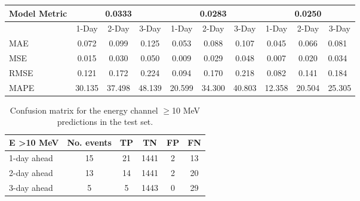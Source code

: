 \begin{table}[!htp]
\begin{tabular}{lccccccccl}
Model Metric & \multicolumn{3}{c}{0.0333}                      & \multicolumn{3}{c}{0.0283}                      & \multicolumn{3}{c}{0.0250}                      \\ \hline
       & 1-Day          & 2-Day          & 3-Day         & 1-Day          & 2-Day          & 3-Day         & 1-Day    & 2-Day   & \multicolumn{1}{c}{3-Day}  \\ \hline
MAE    & 0.072          & 0.099          & 0.125         & 0.053          & 0.088          & 0.107         & 0.045    & 0.066   & 0.081                      \\
MSE    & 0.015          & 0.030          & 0.050         & 0.009          & 0.029          & 0.048         & 0.007    & 0.020   & 0.034                      \\
RMSE   & 0.121          & 0.172          & 0.224         & 0.094          & 0.170          & 0.218         & 0.082    & 0.141   & 0.184                      \\
MAPE   & 30.135         & 37.498         & 48.139        & 20.599         & 34.300         & 40.803        & 12.358   & 20.504  & 25.305                     \\ \hline
\end{tabular}
\label{table_performance}
\end{table}

\begin{table}[!htp]
\centering
\caption{Confusion matrix for the energy channel $\geq$10 MeV predictions in the test set.}
\label{table_skillscores}
\begin{tabular}{lccccc}
	\hline
	\bf{E \textgreater{}10 MeV} & \bf{No. events} & \bf{TP} & \bf{TN} & \bf{FP} & \bf{FN} \\ \hline
	1-day ahead            & 15         & 21 & 1441 & 2  & 13 \\ \hline
	2-day ahead            & 13         & 14 & 1441 & 2  & 20 \\ \hline
	3-day ahead            & 5          & 5  & 1443 & 0  & 29 \\ \hline
	\end{tabular}
\end{table}

